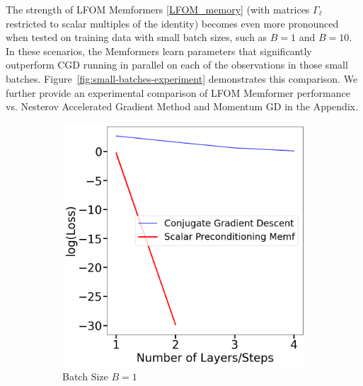 \documentclass[11pt]{article}
\numberwithin{equation}{section}
\begin{document}
The strength of LFOM Memformers \eqref{LFOM_memory} (with matrices \( \Gamma_\ell \) restricted to scalar multiples of the identity) becomes even more pronounced when tested on training data with small batch sizes, such as \( B = 1 \) and \( B = 10 \). In these scenarios, the Memformers learn parameters that significantly outperform CGD running in parallel on each of the observations in those small batches. Figure~\ref{fig:small-batches-experiment} demonstrates this comparison. We further provide an experimental comparison of LFOM Memformer performance vs. Nesterov Accelerated Gradient Method and Momentum GD in the Appendix.

\begin{figure}
  \centering
  \begin{subfigure}[b]{0.45\textwidth}
    \centering
    \includegraphics[width=\textwidth]{Batch_Size_1.png}
    \caption{Batch Size \( B = 1 \)}
    \label{fig:batch_size_1}
  \end{subfigure}
  \hfill
  \begin{subfigure}[b]{0.45\textwidth}
    \centering

\end{subfigure}
\end{figure}
\end{document}
